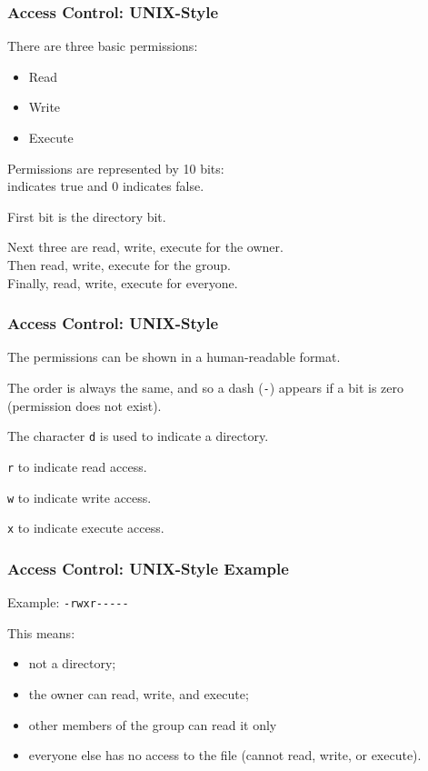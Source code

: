\begin{frame}
\frametitle{Access Control: UNIX-Style}


There are three basic permissions: 

\begin{itemize}
	\item Read
	\item Write
	\item Execute
\end{itemize}

Permissions are represented by 10 bits:\\ 
 indicates true and 0 indicates false.

First bit is the directory bit.

Next three are read, write, execute for the owner.\\
Then read, write, execute for the group.\\
Finally, read, write, execute for everyone.


\end{frame}

\begin{frame}
\frametitle{Access Control: UNIX-Style}


The permissions can be shown in a human-readable format.

The order is always the same, and so a dash (\texttt{-}) appears if a bit is zero (permission does not exist). 

The character \texttt{d} is used to indicate a directory.

\texttt{r} to indicate read access.

\texttt{w} to indicate write access.

\texttt{x} to indicate execute access.



\end{frame}

\begin{frame}
\frametitle{Access Control: UNIX-Style Example}


Example: \texttt{-rwxr{-}{-}{-}{-}{-}} 

This means:
\begin{itemize}
\item not a directory; 
\item the owner can read, write, and execute; 
\item other members of the group can read it only
\item everyone else has no access to the file (cannot read, write, or execute).
\end{itemize}


\end{frame}

